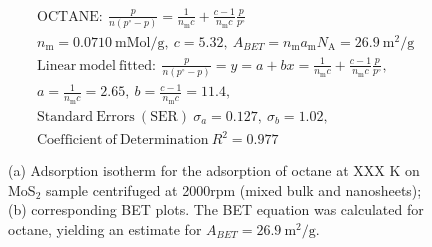 

\begin{align*}
&\mathrm{OCTANE:}\ \frac{p}{n(p^\circ-p)}=\frac{1}{n_\mathrm{m}c}+\frac{c-1}{n_\mathrm{m}c}\frac{p}{p^\circ}\\
&{n_\mathrm{m}}=0.0710\ \mathrm{mMol/g},\ c=5.32,\ A_{BET}={n_\mathrm{m}}{a_\mathrm{m}}{N_\mathrm{A}}=26.9\ \mathrm{m}^2\mathrm{/g}\\
&\mathrm{Linear\ model\ fitted:}\ \frac{p}{n(p^\circ-p)}=y=a+bx=\frac{1}{n_\mathrm{m}c}+\frac{c-1}{n_\mathrm{m}c}\frac{p}{p^\circ},\\
&a=\frac{1}{n_\mathrm{m}c}=2.65,\ b=\frac{c-1}{n_\mathrm{m}c}=11.4,\\
&\mathrm{Standard\ Errors\ (SER)}\ \sigma_a=0.127,\ \sigma_b=1.02,\\
&\mathrm{Coefficient\ of\ Determination}\ R^2 = 0.977
\end{align*}


\begin{figure}[htb]
\hfill
{}
\caption{(a) Adsorption isotherm for the adsorption of octane at XXX K on MoS$_2$ 
sample centrifuged at 2000rpm (mixed bulk and nanosheets);
(b) corresponding BET plots. The BET equation was calculated for octane, yielding an estimate for $A_{BET}=26.9\ \mathrm{m}^2\mathrm{/g}$.}

\label{fig:sa-Nanosheets-Prep-I-1500rpm-10mg-01-3mm-30C-S1-SA-10ml}
\end{figure}


